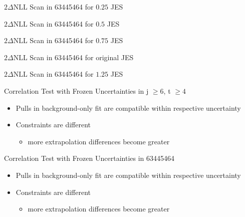 \begin{frame}{$2\Delta \text{NLL}$ Scan in 63445464 for $\num[round-precision=2]{0.25}$ JES}
\end{frame}

\begin{frame}{$2\Delta \text{NLL}$ Scan in 63445464 for $\num[round-precision=2]{0.5}$ JES}
\end{frame}

\begin{frame}{$2\Delta \text{NLL}$ Scan in 63445464 for $\num[round-precision=2]{0.75}$ JES}
\end{frame}

\begin{frame}{$2\Delta \text{NLL}$ Scan in 63445464 for original JES}
\end{frame}

\begin{frame}{$2\Delta \text{NLL}$ Scan in 63445464 for $\num[round-precision=2]{1.25}$ JES}
\end{frame}

\begin{frame}{Correlation Test with Frozen Uncertainties in j $\geq 6$, t $\geq 4$}

\begin{itemize}
\item Pulls in background-only fit are compatible within respective uncertainty\\
\item Constraints are different
\begin{itemize}
\item more extrapolation \rar differences become greater

\end{itemize}
\end{itemize}
\end{frame}


\begin{frame}{Correlation Test with Frozen Uncertainties in 63445464}

\begin{itemize}
\item Pulls in background-only fit are compatible within respective uncertainty\\
\item Constraints are different
\begin{itemize}
\item more extrapolation \rar differences become greater

\end{itemize}
\end{itemize}
\end{frame}